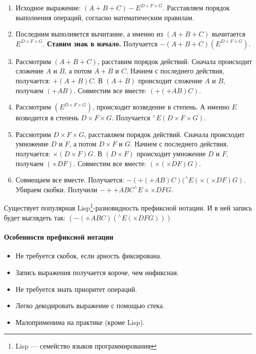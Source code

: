 \begin{enumerate}
    \item   Исходное выражение: $(A + B + C) - E^{D \times F \times G}$.
            Расставляем порядок выполнения операций, согласно математическим правилам.
    \item   Последним выполняется вычитание, а именно из $(A + B + C)$ вычитается $E^{D \times F \times G}$.
            \textbf{Ставим знак в начало.}
            Получается $-(A + B + C)(E^{D\times F\times G})$.
    \item   Рассмотрим $(A + B + C)$, расставим порядок действий.
            Сначала происходит сложение $A$ и $B$, а потом $A+B$ и $C$.
            Начнем с последнего действия, получается: $+(A+B)C$.
            В $(A+B)$ происходит сложение $A$ и $B$, получаем $(+AB)$.
            Совместим все вместе: $(+(+AB)C)$.
    \item   Рассмотрим $(E^{D\times F\times G})$, происходит возведение в степень.
            А именно $E$ возводится в степень $D\times F\times G$.
            Получается $^{\wedge}E(D\times F\times G)$.
    \item   Рассмотрим $D\times F\times G$, расставляем порядок действий.
            Сначала происходит умножение $D$ и $F$, а потом $D\times F$ и $G$.
            Начнем с последнего действия, получается: $\times(D \times F)G$.
            В $(D \times F)$ происходит умножение $D$ и $F$, получаем $(\times DF)$.
            Совместим все вместе: $(\times(\times DF)G)$.
    \item   Совмещаем все вместе.
            Получается: $-(+(+AB)C)(^{\wedge}E(\times(\times DF)G)$.
            Убираем скобки.
            Получили $-++ABC^{\wedge}E\times\times DFG$.
\end{enumerate}

Существует популярная Lisp\footnote{Lisp --- семейство языков программирования}-разновидность префиксной нотации.
И в ней запись будет выглядеть так: $(-(+ABC)(^{\wedge}E(\times DFG)))$

\paragraph{Особенности префиксной нотации}\label{par:prefix-notation-features}
\begin{itemize}
    \item Не требуется скобок, если арность фиксирована.
    \item Запись выражения получается короче, чем инфиксная.
    \item Не требуется знать приоритет операций.
    \item Легко декодировать выражение с помощью стека.
    \item Малоприменима на практике (кроме Lisp).
\end{itemize}

